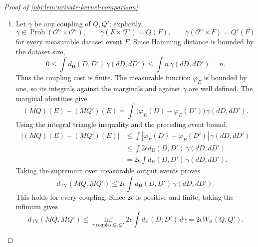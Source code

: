 \begin{proof}[Proof of \cref{obj:lem:private-kernel-comparison}]
\begin{enumerate}
\item Let \(\gamma\) be any coupling of \(Q,Q'\); explicitly,
\[
\gamma\in\operatorname{Prob}(\mathcal O^n\times\mathcal O^n),
\qquad
\gamma(F\times\mathcal O^n)=Q(F),
\qquad
\gamma(\mathcal O^n\times F)=Q'(F)
\]
for every measurable dataset event \(F\). Since Hamming distance is bounded by the dataset size,
\[
0\le
\int d_{\mathrm H}(D,D')\,\gamma(dD,dD')
\le
\int n\,\gamma(dD,dD')
=n.
\]
Thus the coupling cost is finite. The measurable function \(\varphi_E\) is bounded by one, so its integrals against the marginals and against \(\gamma\) are well defined. The marginal identities give
\[
(MQ)(E)-(MQ')(E)
=
\int\bigl(\varphi_E(D)-\varphi_E(D')\bigr)\,
\gamma(dD,dD').
\]
Using the integral triangle inequality and the preceding event bound,
\[
\begin{aligned}
|(MQ)(E)-(MQ')(E)|
&\le
\int|\varphi_E(D)-\varphi_E(D')|\,\gamma(dD,dD')\\
&\le
\int2\epsilon d_{\mathrm H}(D,D')\,\gamma(dD,dD')\\
&=
2\epsilon\int d_{\mathrm H}(D,D')\,\gamma(dD,dD').
\end{aligned}
\]
Taking the supremum over measurable output events proves
\[
d_{\mathrm{TV}}(MQ,MQ')
\le
2\epsilon\int d_{\mathrm H}(D,D')\,\gamma(dD,dD').
\]
This holds for every coupling. Since \(2\epsilon\) is positive and finite, taking the infimum gives
\[
d_{\mathrm{TV}}(MQ,MQ')
\le
\inf_{\gamma\ \mathrm{couples}\ Q,Q'}
2\epsilon\int d_{\mathrm H}(D,D')\,d\gamma
=
2\epsilon W_{\mathrm H}(Q,Q').
\]


\end{enumerate}
\end{proof}
